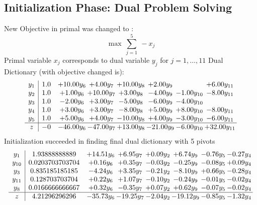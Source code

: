 \documentclass[8pt]{article}
\begin{document}
\subsection{Initialization Phase: Dual Problem Solving}
New Objective in primal was changed to : \[ \max\ \sum_{j=1}^{5}\ - x_j \] 
Primal variable $x_j$ corresponds to dual variable $y_j$ for $j = 1,\ldots,11$
Dual Dictionary (with objective changed is): 
\[\begin{array}{c| c c@{\hskip 2pt} c@{\hskip 2pt} c@{\hskip 2pt} c@{\hskip 2pt} c@{\hskip 2pt} c@{\hskip 2pt} }
 y_{1}   &  1.0 & + 10.00 y_{6} & +  4.00 y_{7} & + 10.00 y_{8} & +  2.00 y_{9} &   & +  6.00 y_{11}\\
 y_{2}   &  1.0 & +  1.00 y_{6} & + 10.00 y_{7} & +  3.00 y_{8} & -4.00 y_{9} & -1.00 y_{10} & -8.00 y_{11}\\
 y_{3}   &  1.0 & -2.00 y_{6} & +  3.00 y_{7} & -5.00 y_{8} & -6.00 y_{9} & -4.00 y_{10} &   \\
 y_{4}   &  1.0 & +  3.00 y_{6} & +  3.00 y_{7} & -8.00 y_{8} & +  5.00 y_{9} & +  8.00 y_{10} & -8.00 y_{11}\\
 y_{5}   &  1.0 & +  5.00 y_{6} & +  4.00 y_{7} & -10.00 y_{8} & +  4.00 y_{9} & -3.00 y_{10} & -6.00 y_{11}\\
\hline
z    &  -0 & -46.00 y_{6} & -47.00 y_{7} & + 13.00 y_{8} & -21.00 y_{9} & -6.00 y_{10} & + 32.00 y_{11}\\
\end{array}\]
Initialization succeeded in finding final dual dictionary with 5 pivots
\[\begin{array}{c| c c@{\hskip 2pt} c@{\hskip 2pt} c@{\hskip 2pt} c@{\hskip 2pt} c@{\hskip 2pt} c@{\hskip 2pt} }
 y_{1}   &  1.93888888889 & + 14.51 y_{6} & +  6.95 y_{7} & +  0.09 y_{2} & +  6.74 y_{9} & -0.76 y_{5} & -0.27 y_{4}\\
 y_{10}   &  0.0203703703704 & +  0.16 y_{6} & +  0.35 y_{7} & -0.03 y_{2} & -0.25 y_{9} & -0.08 y_{5} & +  0.09 y_{4}\\
 y_{3}   &  0.835185185185 & -4.24 y_{6} & +  3.35 y_{7} & -0.21 y_{2} & -8.10 y_{9} & +  0.66 y_{5} & -0.28 y_{4}\\
 y_{11}   &  0.128703703704 & +  0.22 y_{6} & +  1.07 y_{7} & -0.10 y_{2} & -0.24 y_{9} & -0.01 y_{5} & -0.02 y_{4}\\
 y_{8}   &  0.0166666666667 & +  0.32 y_{6} & -0.35 y_{7} & +  0.07 y_{2} & +  0.62 y_{9} & -0.07 y_{5} & -0.02 y_{4}\\
\hline
z    &  4.21296296296 & -35.73 y_{6} & -19.25 y_{7} & -2.04 y_{2} & -19.12 y_{9} & -0.85 y_{5} & -1.32 y_{4}\\
\end{array}\]
\end{document}
